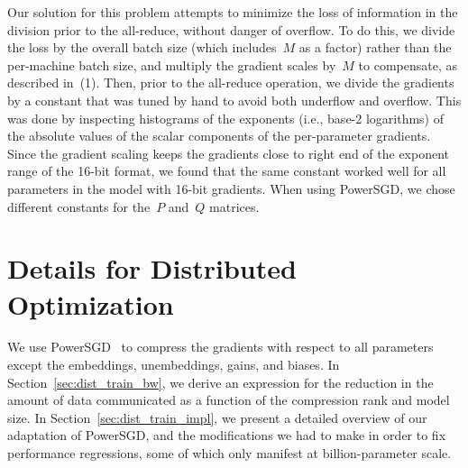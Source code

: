 \documentclass{article}
\begin{document}
\begin{enumerate}
    Our solution for this problem attempts to minimize the loss of information in the division prior to the all-reduce, without danger of overflow. To do this, we divide the loss by the overall batch size (which includes~$M$ as a factor) rather than the per-machine batch size, and multiply the gradient scales by~$M$ to compensate, as described in~(1). Then, prior to the all-reduce operation, we divide the gradients by a constant that was tuned by hand to avoid both underflow and overflow. This was done by inspecting histograms of the exponents (i.e., base-2 logarithms) of the absolute values of the scalar components of the per-parameter gradients. Since the gradient scaling keeps the gradients close to right end of the exponent range of the 16-bit format, we found that the same constant worked well for all parameters in the model with 16-bit gradients. When using PowerSGD, we chose different constants for the~$P$ and~$Q$ matrices.
\end{enumerate}

\section{Details for Distributed Optimization}

We use PowerSGD~\cite{vogels2019powersgd} to compress the gradients with respect to all parameters except the embeddings, unembeddings, gains, and biases. In Section~\ref{sec:dist_train_bw}, we derive an expression for the reduction in the amount of data communicated as a function of the compression rank and model size. In Section~\ref{sec:dist_train_impl}, we present a detailed overview of our adaptation of PowerSGD, and the modifications we had to make in order to fix performance regressions, some of which only manifest at billion-parameter scale.
\end{document}
